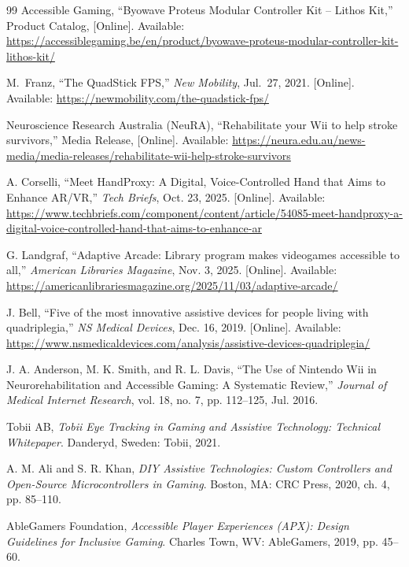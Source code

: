 \documentclass[twoside, a4paper, 11pt]{article}
\begin{document}
\begin{thebibliography}{99}
Accessible Gaming, ``Byowave Proteus Modular Controller Kit -- Lithos Kit,'' Product Catalog, [Online]. Available: \url{https://accessiblegaming.be/en/product/byowave-proteus-modular-controller-kit-lithos-kit/}

M.~Franz, ``The QuadStick FPS,'' \emph{New Mobility}, Jul.~27, 2021. [Online]. Available: \url{https://newmobility.com/the-quadstick-fps/}

Neuroscience Research Australia (NeuRA), ``Rehabilitate your Wii to help stroke survivors,'' Media Release, [Online]. Available: \url{https://neura.edu.au/news-media/media-releases/rehabilitate-wii-help-stroke-survivors}

A. Corselli, ``Meet HandProxy: A Digital, Voice-Controlled Hand that Aims to Enhance AR/VR,'' \emph{Tech Briefs}, Oct. 23, 2025. [Online]. Available: \url{https://www.techbriefs.com/component/content/article/54085-meet-handproxy-a-digital-voice-controlled-hand-that-aims-to-enhance-ar}

G. Landgraf, ``Adaptive Arcade: Library program makes videogames accessible to all,'' \emph{American Libraries Magazine}, Nov. 3, 2025. [Online]. Available: \url{https://americanlibrariesmagazine.org/2025/11/03/adaptive-arcade/}

J. Bell, ``Five of the most innovative assistive devices for people living with quadriplegia,'' \emph{NS Medical Devices}, Dec. 16, 2019. [Online]. Available: \url{https://www.nsmedicaldevices.com/analysis/assistive-devices-quadriplegia/}

J. A. Anderson, M. K. Smith, and R. L. Davis, ``The Use of Nintendo Wii in Neurorehabilitation and Accessible Gaming: A Systematic Review,'' \emph{Journal of Medical Internet Research}, vol. 18, no. 7, pp. 112--125, Jul. 2016.

Tobii AB, \emph{Tobii Eye Tracking in Gaming and Assistive Technology: Technical Whitepaper}. Danderyd, Sweden: Tobii, 2021.

A. M. Ali and S. R. Khan, \emph{DIY Assistive Technologies: Custom Controllers and Open-Source Microcontrollers in Gaming}. Boston, MA: CRC Press, 2020, ch. 4, pp. 85--110.

AbleGamers Foundation, \emph{Accessible Player Experiences (APX): Design Guidelines for Inclusive Gaming}. Charles Town, WV: AbleGamers, 2019, pp. 45--60.


\end{thebibliography}
\end{document}
